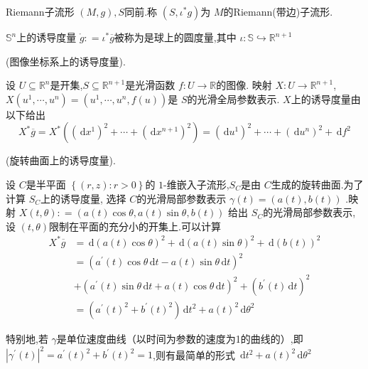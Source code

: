 \documentclass[../../几何与拓扑.tex]{subfiles}
\begin{document}
\begin{definition}{Riemann子流形}
    $ \left( M,g \right),S  $同前.称 $ \left( S,\iota^{*}g \right)  $为 $ M $的Riemann(带边)子流形.   
\end{definition}

\begin{example}
    $ \mathbb{S}^{n} $上的诱导度量 $ \mathring{g}: = \iota^{*} \overline{g} $被称为是球上的圆度量,其中 $ \iota : \mathbb{S}\hookrightarrow \mathbb{R} ^{n+ 1} $   
\end{example}


\begin{example}(图像坐标系上的诱导度量).

    设 $ U\subseteq \mathbb{R} ^{n} $是开集,$ S\subseteq \mathbb{R} ^{n+ 1} $是光滑函数 $ f:U\to \mathbb{R}  $的图像.
    映射 $ X:U\to \mathbb{R} ^{n+ 1} $,$ X\left( u^{1},\cdots ,u^{n} \right)  =\left( u^{1},\cdots ,u^{n},f\left( u \right)  \right) $是 $ S $的光滑全局参数表示.
    $ X $上的诱导度量由以下给出 $$
    X^{*}\overline{g}= X^{*}\left( \left( \,\mathrm{d} x^{1} \right)^{2}+ \cdots + \left( \,\mathrm{d} x^{n+ 1} \right)^{2}   \right) = \left( \,\mathrm{d} u^{1} \right)^{2}+ \cdots + \left( \,\mathrm{d} u^{n} \right)^{2}+ \,\mathrm{d} f^{2}   
    $$       
\end{example}


\begin{example}(旋转曲面上的诱导度量).

    设 $ C $是半平面 $ \left\{ \left( r,z \right): r >0  \right\} $的 $ 1 $-维嵌入子流形,$ S_{C} $是由 $ C $生成的旋转曲面.为了计算 $ S_{C} $上的诱导度量,
    选择 $ C $的光滑局部参数表示 $ \gamma\left( t \right)=\left( a\left( t \right),b\left( t \right)   \right)   $    .映射 $ X\left( t,\theta \right): = \left( a\left( t \right)\cos \theta,a\left( t \right)\sin \theta,b\left( t \right)    \right)   $ 
    给出 $ S_{C} $的光滑局部参数表示,设 $ \left( t,\theta \right)  $限制在平面的充分小的开集上.可以计算 $$
    \begin{aligned}
    X^{*} \overline{g}&= \,\mathrm{d} \left( a\left( t \right)\cos \theta  \right)  ^{2}+ \,\mathrm{d} \left( a\left( t \right)\sin \theta  \right) ^{2}+ \,\mathrm{d} \left( b\left( t \right)  \right)^{2}\\ 
     & = \left( a^{\prime} \left( t \right)\cos \theta \,\mathrm{d} t-a\left( t \right)\sin \theta \,\mathrm{d} t   \right) ^{2}\\ 
     & +  \left( a^{\prime} \left( t \right)\sin \theta \,\mathrm{d} t+  a\left( t \right)\cos \theta \,\mathrm{d} t   \right)^{2}+  \left( b^{\prime} \left( t \right)  \,\mathrm{d} t\right)^{2} \\ 
     & = \left( a^{\prime} \left( t \right)^{2}+ b^{\prime} \left( t \right) ^{2}  \right) \,\mathrm{d} t^{2}+  a\left( t \right)^{2} \,\mathrm{d} \theta^{2}
    \end{aligned}
    $$  

    特别地,若 $ \gamma $是单位速度曲线（以时间为参数的速度为1的曲线的）,即 $ \left| \gamma^{\prime} \left( t \right)  \right|^{2}= a^{\prime} \left( t \right)^{2}+ b^{\prime} \left( t \right)   ^{2}=1 $,则有最简单的形式 $ \,\mathrm{d} t^{2}+ a\left( t \right)^{2}\,\mathrm{d} \theta^{2}  $   
\end{example}
\end{document}
